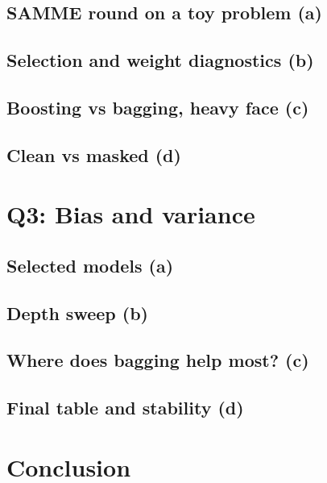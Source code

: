 \documentclass[10pt,twocolumn,letterpaper]{article}
\begin{document}
\subsection{SAMME round on a toy problem (a)}
\subsection{Selection and weight diagnostics (b)}
\subsection{Boosting vs bagging, heavy face (c)}
\subsection{Clean vs masked (d)}

\section{Q3: Bias and variance}
\subsection{Selected models (a)}
\subsection{Depth sweep (b)}
\subsection{Where does bagging help most? (c)}
\subsection{Final table and stability (d)}

\section{Conclusion}

{\small


}
\end{document}
